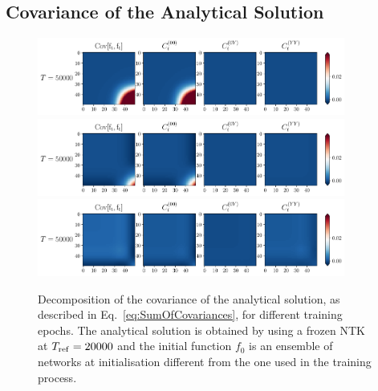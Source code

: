 \FloatBarrier

\subsection{Covariance of the Analytical Solution}
\label{sec:CovarianceAnlyticalSolution}


\begin{figure}[ht!]
  \centering
  \includegraphics[width=0.90\textwidth]{plots/analytical_solution/covariance/covariance_ft_0_L0.pdf}
  \includegraphics[width=0.90\textwidth]{plots/analytical_solution/covariance/covariance_ft_1_L0.pdf}
  \includegraphics[width=0.90\textwidth]{plots/analytical_solution/covariance/covariance_ft_100_L0.pdf}
  \caption{Decomposition of the covariance of the analytical solution, as
  described in Eq.~\eqref{eq:SumOfCovariances}, for different training epochs.
  The analytical solution is obtained by using a frozen NTK at
  $T_{\rm{ref}}=20000$ and the initial function $f_0$ is an ensemble of
  networks at initialisation different from the one used in the training
  process.}
  \label{fig:analytical_covariance_L0}
\end{figure}
